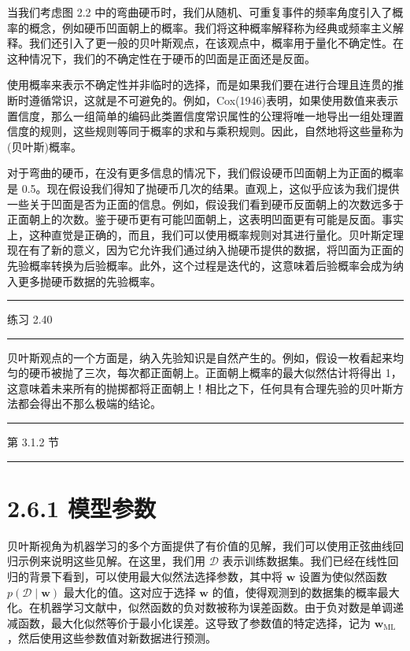 \documentclass[10pt]{article}
\newcommand{\HRule}{\begin{center}\rule{0.9\linewidth}{0.2mm}\end{center}}
\begin{document}
当我们考虑图 2.2 中的弯曲硬币时，我们从随机、可重复事件的频率角度引入了概率的概念，例如硬币凹面朝上的概率。我们将这种概率解释称为经典或频率主义解释。我们还引入了更一般的贝叶斯观点，在该观点中，概率用于量化不确定性。在这种情况下，我们的不确定性在于硬币的凹面是正面还是反面。

使用概率来表示不确定性并非临时的选择，而是如果我们要在进行合理且连贯的推断时遵循常识，这就是不可避免的。例如，Cox(1946)表明，如果使用数值来表示置信度，那么一组简单的编码此类置信度常识属性的公理将唯一地导出一组处理置信度的规则，这些规则等同于概率的求和与乘积规则。因此，自然地将这些量称为(贝叶斯)概率。

对于弯曲的硬币，在没有更多信息的情况下，我们假设硬币凹面朝上为正面的概率是 0.5。现在假设我们得知了抛硬币几次的结果。直观上，这似乎应该为我们提供一些关于凹面是否为正面的信息。例如，假设我们看到硬币反面朝上的次数远多于正面朝上的次数。鉴于硬币更有可能凹面朝上，这表明凹面更有可能是反面。事实上，这种直觉是正确的，而且，我们可以使用概率规则对其进行量化。贝叶斯定理现在有了新的意义，因为它允许我们通过纳入抛硬币提供的数据，将凹面为正面的先验概率转换为后验概率。此外，这个过程是迭代的，这意味着后验概率会成为纳入更多抛硬币数据的先验概率。

\HRule

练习 2.40

\HRule

贝叶斯观点的一个方面是，纳入先验知识是自然产生的。例如，假设一枚看起来均匀的硬币被抛了三次，每次都正面朝上。正面朝上概率的最大似然估计将得出 1，这意味着未来所有的抛掷都将正面朝上！相比之下，任何具有合理先验的贝叶斯方法都会得出不那么极端的结论。

\HRule

第 3.1.2 节

\HRule

\section*{2.6.1 模型参数}

贝叶斯视角为机器学习的多个方面提供了有价值的见解，我们可以使用正弦曲线回归示例来说明这些见解。在这里，我们用 \(\mathcal{D}\) 表示训练数据集。我们已经在线性回归的背景下看到，可以使用最大似然法选择参数，其中将 \(\mathbf{w}\) 设置为使似然函数 \(p\left( {\mathcal{D} \mid  \mathbf{w}}\right)\) 最大化的值。这对应于选择 \(\mathbf{w}\) 的值，使得观测到的数据集的概率最大化。在机器学习文献中，似然函数的负对数被称为误差函数。由于负对数是单调递减函数，最大化似然等价于最小化误差。这导致了参数值的特定选择，记为 \({\mathbf{w}}_{\mathrm{{ML}}}\) ，然后使用这些参数值对新数据进行预测。
\end{document}
